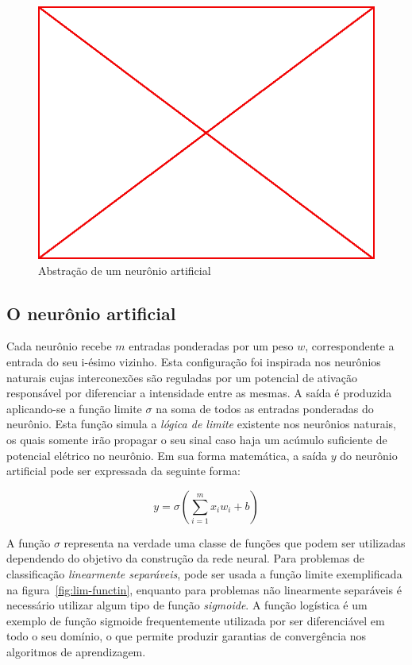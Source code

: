 \begin{figure}
  \caption{Abstração de um neurônio artificial}
  \begin{center}
    \includegraphics[scale=0.5]{placeholder}
  \end{center}
\end{figure}

\subsection{O neurônio artificial}

Cada neurônio recebe $m$ entradas ponderadas por um peso $w$,
correspondente a entrada do seu i-ésimo vizinho. Esta configuração foi
inspirada nos neurônios naturais cujas interconexões são reguladas por um
potencial de ativação responsável por diferenciar a intensidade entre as
mesmas. A saída é produzida aplicando-se a função limite $\sigma$ na soma
de todos as entradas ponderadas do neurônio. Esta função simula a \emph{lógica
  de limite} existente nos neurônios naturais, os quais somente irão propagar o
seu sinal caso haja um acúmulo suficiente de potencial elétrico no neurônio. Em
sua forma matemática, a saída $y$ do neurônio artificial pode ser expressada da
seguinte forma:

$$y=\sigma(\sum_{i=1}^{m}x_i w_i + b)$$

A função $\sigma$ representa na verdade uma classe de funções que podem ser
utilizadas dependendo do objetivo da construção da rede neural. Para problemas
de classificação \emph{linearmente separáveis}, pode ser usada a função limite
exemplificada na figura~\ref{fig:lim-functin}, enquanto para problemas não
linearmente separáveis é necessário utilizar algum tipo de função
\emph{sigmoide}. A função logística é um exemplo de função sigmoide
frequentemente utilizada por ser diferenciável em todo o seu domínio, o que
permite produzir garantias de convergência nos algoritmos de aprendizagem.

